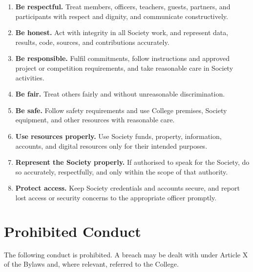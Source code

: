 \documentclass[a4paper]{article}
\begin{document}
\begin{enumerate}
  \item \textbf{Be respectful.} Treat members, officers, teachers, guests,
    partners, and participants with respect and dignity, and communicate
    constructively.
  \item \textbf{Be honest.} Act with integrity in all Society work, and
    represent data, results, code, sources, and contributions accurately.
  \item \textbf{Be responsible.} Fulfil commitments, follow instructions and
    approved project or competition requirements, and take reasonable care
    in Society activities.
  \item \textbf{Be fair.} Treat others fairly and without unreasonable
    discrimination.
  \item \textbf{Be safe.} Follow safety requirements and use College
    premises, Society equipment, and other resources with reasonable care.
  \item \textbf{Use resources properly.} Use Society funds, property,
    information, accounts, and digital resources only for their intended
    purposes.
  \item \textbf{Represent the Society properly.} If authorised to speak for
    the Society, do so accurately, respectfully, and only within the scope
    of that authority.
  \item \textbf{Protect access.} Keep Society credentials and accounts
    secure, and report lost access or security concerns to the appropriate
    officer promptly.
\end{enumerate}

\section{Prohibited Conduct}

The following conduct is prohibited. A breach may be dealt with under
Article X of the Bylaws and, where relevant, referred to the College.
\end{document}
